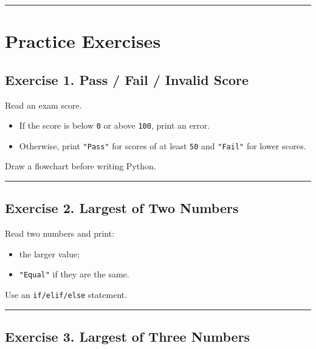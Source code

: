 \documentclass[
  11pt,
  a4paper,
]{article}
\providecommand{\tightlist}{%
  \setlength{\itemsep}{0pt}\setlength{\parskip}{0pt}}
\begin{document}
\begin{center}\rule{0.5\linewidth}{0.5pt}\end{center}

\section{Practice Exercises}\label{practice-exercises}

\subsection{Exercise 1. Pass / Fail / Invalid
Score}\label{exercise-1.-pass-fail-invalid-score}

Read an exam score.

\begin{itemize}
\tightlist
\item
  If the score is below \texttt{0} or above \texttt{100}, print an
  error.
\item
  Otherwise, print \texttt{"Pass"} for scores of at least \texttt{50}
  and \texttt{"Fail"} for lower scores.
\end{itemize}

Draw a flowchart before writing Python.

\begin{center}\rule{0.5\linewidth}{0.5pt}\end{center}

\subsection{Exercise 2. Largest of Two
Numbers}\label{exercise-2.-largest-of-two-numbers}

Read two numbers and print:

\begin{itemize}
\tightlist
\item
  the larger value;
\item
  \texttt{"Equal"} if they are the same.
\end{itemize}

Use an \texttt{if/elif/else} statement.

\begin{center}\rule{0.5\linewidth}{0.5pt}\end{center}

\subsection{Exercise 3. Largest of Three
Numbers}\label{exercise-3.-largest-of-three-numbers}
\end{document}
